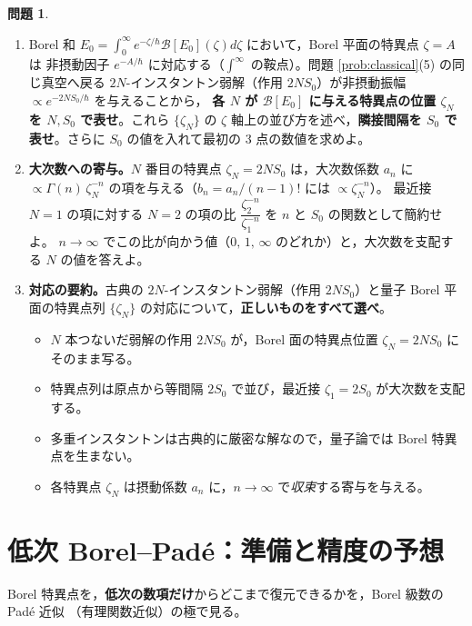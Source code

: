 \documentclass[dvipdfmx, uplatex]{jsarticle}
\newcommand{\hb}{\hbar}
\newcommand{\Bor}{\mathcal{B}}
\theoremstyle{definition}
\newtheorem{prob}{問題}
\begin{document}
\begin{prob}\label{prob:periodic}
\begin{enumerate}
\item Borel 和 $E_0=\int_0^\infty e^{-\zeta/\hb}\Bor[E_0](\zeta)d\zeta$ において，Borel 平面の特異点 $\zeta=A$ は
非摂動因子 $e^{-A/\hb}$ に対応する（$\int^\infty$ の鞍点）。問題 \ref{prob:classical}(5) の同じ真空へ戻る
$2N$-インスタントン弱解（作用 $2NS_0$）が非摂動振幅 $\propto e^{-2NS_0/\hb}$ を与えることから，
\textbf{各 $N$ が $\Bor[E_0]$ に与える特異点の位置 $\zeta_N$ を $N,S_0$ で表せ}。これら $\{\zeta_N\}$ の
$\zeta$ 軸上の並び方を述べ，\textbf{隣接間隔を $S_0$ で表せ}。さらに $S_0$ の値を入れて最初の 3 点の数値を求めよ。
\item \textbf{大次数への寄与。}$N$ 番目の特異点 $\zeta_N=2NS_0$ は，大次数係数 $a_n$ に
$\propto\Gamma(n)\,\zeta_N^{-n}$ の項を与える（$b_n=a_n/(n-1)!$ には $\propto\zeta_N^{-n}$）。
最近接 $N=1$ の項に対する $N=2$ の項の比 $\dfrac{\zeta_2^{-n}}{\zeta_1^{-n}}$ を $n$ と $S_0$ の関数として簡約せよ。
$n\to\infty$ でこの比が向かう値（$0,\,1,\,\infty$ のどれか）と，大次数を支配する $N$ の値を答えよ。
\item \textbf{対応の要約。}古典の $2N$-インスタントン弱解（作用 $2NS_0$）と量子 Borel 平面の特異点列
$\{\zeta_N\}$ の対応について，\textbf{正しいものをすべて選べ}。
\begin{itemize}\setlength{\itemsep}{1pt}
\item[(あ)] $N$ 本つないだ弱解の作用 $2NS_0$ が，Borel 面の特異点位置 $\zeta_N=2NS_0$ にそのまま写る。
\item[(い)] 特異点列は原点から等間隔 $2S_0$ で並び，最近接 $\zeta_1=2S_0$ が大次数を支配する。
\item[(う)] 多重インスタントンは古典的に厳密な解なので，量子論では Borel 特異点を生まない。
\item[(え)] 各特異点 $\zeta_N$ は摂動係数 $a_n$ に，$n\to\infty$ で\emph{収束}する寄与を与える。
\end{itemize}
\end{enumerate}
\end{prob}

\section{低次 Borel--Pad\'e：準備と精度の予想}
Borel 特異点を，\textbf{低次の数項だけ}からどこまで復元できるかを，Borel 級数の Pad\'e 近似
（有理関数近似）の極で見る。
\end{document}
